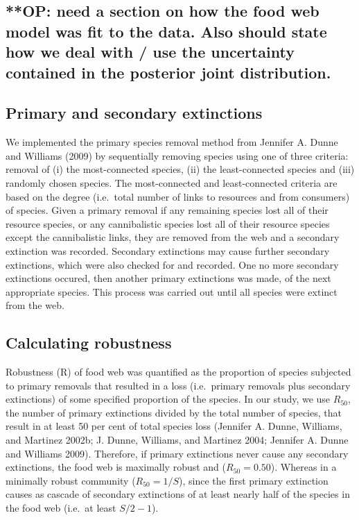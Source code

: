\documentclass{article}
\begin{document}
\hypertarget{op-need-a-section-on-how-the-food-web-model-was-fit-to-the-data.-also-should-state-how-we-deal-with-use-the-uncertainty-contained-in-the-posterior-joint-distribution.}{%
\subsection{**OP: need a section on how the food web model was fit to
the data. Also should state how we deal with / use the uncertainty
contained in the posterior joint
distribution.}\label{op-need-a-section-on-how-the-food-web-model-was-fit-to-the-data.-also-should-state-how-we-deal-with-use-the-uncertainty-contained-in-the-posterior-joint-distribution.}}

\hypertarget{primary-and-secondary-extinctions}{%
\subsection{Primary and secondary
extinctions}\label{primary-and-secondary-extinctions}}

We implemented the primary species removal method from Jennifer A. Dunne
and Williams (2009) by sequentially removing species using one of three
criteria: removal of (i) the most-connected species, (ii) the
least-connected species and (iii) randomly chosen species. The
most-connected and least-connected criteria are based on the degree
(i.e.~total number of links to resources and from consumers) of species.
Given a primary removal if any remaining species lost all of their
resource species, or any cannibalistic species lost all of their
resource species except the cannibalistic links, they are removed from
the web and a secondary extinction was recorded. Secondary extinctions
may cause further secondary extinctions, which were also checked for and
recorded. One no more secondary extinctions occured, then another
primary extinctions was made, of the next appropriate species. This
process was carried out until all species were extinct from the web.

\hypertarget{calculating-robustness}{%
\subsection{Calculating robustness}\label{calculating-robustness}}

Robustness (R) of food web was quantified as the proportion of species
subjected to primary removals that resulted in a loss (i.e.~primary
removals plus secondary extinctions) of some specified proportion of the
species. In our study, we use \(R_{50}\), the number of primary
extinctions divided by the total number of species, that result in at
least 50 per cent of total species loss (Jennifer A. Dunne, Williams,
and Martinez 2002b; J. Dunne, Williams, and Martinez 2004; Jennifer A.
Dunne and Williams 2009). Therefore, if primary extinctions never cause
any secondary extinctions, the food web is maximally robust and
(\(R_{50} = 0.50\)). Whereas in a minimally robust community
(\(R_{50} = 1/S\)), since the first primary extinction causes as cascade
of secondary extinctions of at least nearly half of the species in the
food web (i.e.~at least \(S/2 - 1\)).
\end{document}
